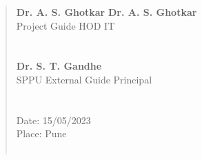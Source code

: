 \documentclass[12pt,a4paper]{report}     %
\begin{document}
\begin{quote}
\singlespace
\textbf{Dr. A. S. Ghotkar} %
\hspace{2in} \textbf{Dr. A. S. Ghotkar}\\
Project Guide\hspace{3.2 in}       HOD IT \\\\\\

\textbf{} %
\hspace{3.7in} \textbf{Dr. S. T. Gandhe}\\
SPPU External Guide\hspace{2.7in}       Principal \\\\\\

Date:  15/05/2023     \\ %
Place:  Pune     %
\\\\


 \end{quote}
\end{document}
